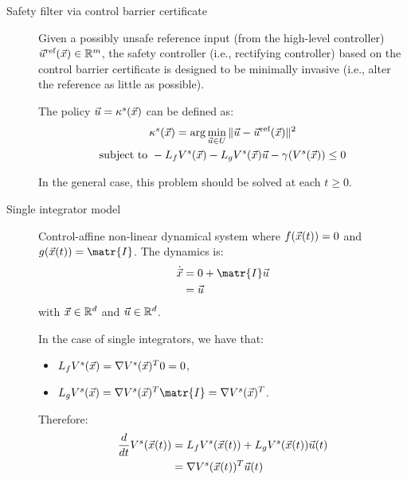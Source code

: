 \begin{description}
    \item[Safety filter via control barrier certificate] 
        Given a possibly unsafe reference input (from the high-level controller) ${\vec{u}}^\text{ref}({\vec{x}}) \in \mathbb{R}^m$, the safety controller (i.e., rectifying controller) based on the control barrier certificate is designed to be minimally invasive (i.e., alter the reference as little as possible). 
        
        The policy ${\vec{u}} = \kappa^s({\vec{x}})$ can be defined as:
        \[
            \begin{gathered}
                \kappa^s({\vec{x}}) = \arg\min_{{\vec{u}} \in U} \Vert {\vec{u}} - {\vec{u}}^\text{ref}({\vec{x}}) \Vert^2 \\
                \text{subject to } -L_fV^s({\vec{x}}) - L_gV^s({\vec{x}}){\vec{u}} - \gamma(V^s({\vec{x}})) \leq 0
            \end{gathered}
        \]

        \begin{remark}
            In the general case, this problem should be solved at each $t \geq 0$.
        \end{remark}


    \item[Single integrator model] 
        Control-affine non-linear dynamical system where $f({\vec{x}}(t)) = 0$ and $g(\x(t)) = \matr{I}$. The dynamics is:
        \[
            \begin{split}
                \dot{\x} 
                &= 0 + \matr{I}\u \\ 
                &= \u
            \end{split}
        \]
        with ${\vec{x}} \in \mathbb{R}^d$ and ${\vec{u}} \in \mathbb{R}^d$.

        \begin{remark}
            In the case of single integrators, we have that:
           \begin{itemize}
            \item $L_f V^s({\vec{x}}) = \nabla V^s({\vec{x}})^T 0 = 0$,
            \item $L_g V^s(\x) = \nabla V^s(\x)^T \matr{I} = \nabla V^s(\x)^T$.
           \end{itemize}
           Therefore:
           \[
                \begin{split}
                    \frac{d}{dt} V^s({\vec{x}}(t)) 
                    &= L_f V^s({\vec{x}}(t)) + L_g V^s({\vec{x}}(t)) {\vec{u}}(t) \\
                    &= \nabla V^s({\vec{x}}(t))^T {\vec{u}}(t)
                \end{split}
           \]
        \end{remark}
\end{description}


